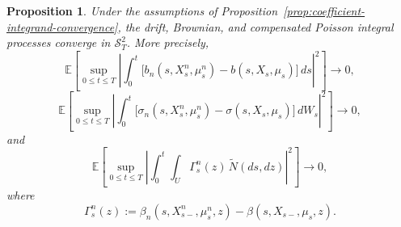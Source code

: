 \documentclass[12pt,oneside, reqno]{amsart}
\newtheorem{proposition}[theorem]{Proposition}
\numberwithin{equation}{section}
\begin{document}
	\begin{proposition}
		\label{prop:integral-term-convergence}
		Under the assumptions of	Proposition~\ref{prop:coefficient-integrand-convergence}, the drift,	Brownian, and compensated Poisson integral processes converge in	$\mathcal S_T^2$. More precisely,
		\begin{equation}
			\label{eq:drift-integral-convergence}
			\mathbb E\left[
			\sup_{0\leq t\leq T}
			\left|
			\int_0^t
			\bigl[
			b_n(s,X_s^n,\mu_s^n)
			-
			b(s,X_s,\mu_s)
			\bigr]\,ds
			\right|^2
			\right]
			\longrightarrow0,
		\end{equation}
		\begin{equation}
			\label{eq:brownian-integral-convergence}
			\mathbb E\left[
			\sup_{0\leq t\leq T}
			\left|
			\int_0^t
			\bigl[
			\sigma_n(s,X_s^n,\mu_s^n)
			-
			\sigma(s,X_s,\mu_s)
			\bigr]\,dW_s
			\right|^2
			\right]
			\longrightarrow0,
		\end{equation}
		and
		\begin{equation}
			\label{eq:poisson-integral-convergence}
			\mathbb E\left[
			\sup_{0\leq t\leq T}
			\left|
			\int_0^t\int_U
			\Gamma_s^n(z)\,
			\widetilde N(ds,dz)
			\right|^2
			\right]
			\longrightarrow0,
		\end{equation}
		where
		\[
		\Gamma_s^n(z)
		:=
		\beta_n(s,X_{s-}^n,\mu_s^n,z)
		-
		\beta(s,X_{s-},\mu_s,z).
		\]
	\end{proposition}
	
\end{document}
